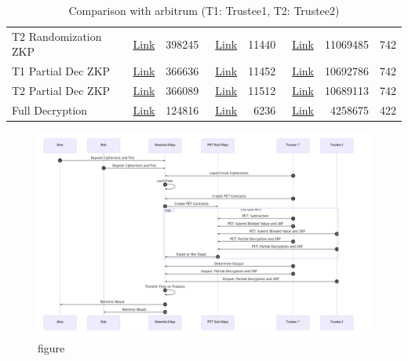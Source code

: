 \begin{table}[]
\begin{tabular}{|l|r|r|r|r|r|r|r|}
		  T2 Randomization ZKP & ~\href{https://kovan.etherscan.io/tx/0x6dd05a76c771089144583a685c2fb9a6b566a626aa86b568230faf83268fdd92}{Link}& 398245 & ~\href{https://kovan.etherscan.io/tx/0xd790b2edd8800a183068b3253d7e5b00e57d850bce8d9b8572494539b58c7e3c}{Link} &11440& ~\href{https://explorer.offchainlabs.com/#/tx/0x71535a6b6d0124cbd61a4993e5e831cc4ba151eec60b1c368a79686f3f5bc1f4}{Link} & 11069485 & 742 \\  \cline{1-8}
	
		 T1 Partial Dec ZKP &~\href{https://kovan.etherscan.io/tx/0x477b3e6b645cc672bbbe99ea3e7fa227962a3e1222071c266442a5ab8366e1bb}{Link} &366636 & ~\href{https://kovan.etherscan.io/tx/0xdd0ffc715dc5733bee36fd99d51898cf978de27ece76777099c4570929039a25}{Link} & 11452& ~\href{https://explorer.offchainlabs.com/#/tx/0x9f7fba14177790f6dad6ad9bb0ec3017803b466a27182768b11163162a3961c3}{Link} & 10692786& 742\\  \cline{1-8}

	 T2 Partial Dec ZKP &~\href{https://kovan.etherscan.io/tx/0x59a6282197cbd71b2c25cd5f3547b41ca7baf33322088f35273c97fce5cf8b56}{Link} &366089 & ~\href{https://kovan.etherscan.io/tx/0xb2a71505f192dd2119634ddd69070c52eb3a3d993aeb632ea8f823eb62f26e84}{Link} & 11512&  ~\href{https://explorer.offchainlabs.com/#/tx/0x724578f12940ebd653613c5037576540ce129ef277e4db67aff135711327e8f8}{Link} & 10689113& 742\\  \cline{1-8}
	
		Full Decryption & ~\href{https://kovan.etherscan.io/tx/0x172804db2abcef274dedfad8f31f84a0bb26c87826842589537f1d511402b282}{Link} & 124816 &  ~\href{https://kovan.etherscan.io/tx/0x10788165eacbbe25066c163fa0cf7a5af07da32c05af001d0f05ad8946974c6e}{Link}& 6236& ~\href{https://explorer.offchainlabs.com/#/tx/0x3515cc045805f2f9af9f378f4725ab4845679ca15ecd2e86758f8d53eb9a7353}{Link} & 4258675 & 422\\  \hline
	\end{tabular}
	\caption{Comparison with arbitrum (T1: Trustee1, T2: Trustee2)} 
\end{table}


\begin{figure}[h]
	\includegraphics[width=15cm]{figures/diagram}
	\caption{figure}
	\centering
\end{figure}

